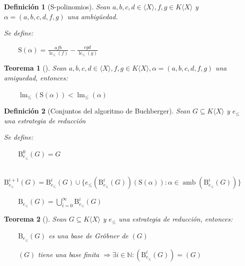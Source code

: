 \documentclass{amsbook}
\theoremstyle{customstyle}
\newtheorem{definition}{Definición}[section]
\newtheorem{theorem}{Teorema}[section]
\newcommand{\definición}[2][]{
  \begin{definition}[#1]
  \setlength{\parindent}{2em} %
  #2
  \end{definition}
}
\newcommand{\teorema}[2][]{
  \begin{theorem}[#1]
  \setlength{\parindent}{2em} %
  #2
  \end{theorem}
}
\DeclareMathOperator{\lm}{lm}
\DeclareMathOperator{\lc}{lc}
\DeclareMathOperator{\amb}{amb}
\begin{document}
\renewcommand{\S}{\text{S}}

\definición[S-polinomios] {
Sean $a, b, c, d ∈ ⟨X⟩, f, g ∈ K⟨X⟩$ y $α = (a, b, c, d, f, g)$ una ambigüedad.

Se define:

    $\S(α) = \frac{afb}{\lc_≤{(f)}} - \frac{cgd}{\lc_≤{(g)}}$
}

\teorema[]{
Sean $a, b, c, d ∈ ⟨X⟩, f, g ∈ K⟨X⟩, α = (a, b, c, d, f, g)$ una amiguedad, entonces:

    $\lm_≤{(\S(α))} < \lm_≤{(α)}$

}


\newcommand{\B}{\text{B}}

\definición[Conjuntos del algoritmo de Buchberger] {
Sean $G ⊆ K⟨X⟩$ y $e_≤$ una estrategia de reducción

Se define:

    $\B_{e_≤}^0(G) = G$

    $\B_{e_≤}^{i + 1}(G) = \B_{e_≤}^i(G) ∪ \{e_≤(\B_{e_≤}^i(G))(\S(α)) : α ∈ \amb(\B_{e_≤}^i(G))\}$

    $\B_{e_≤}(G) = \bigcup_{i = 0}^∞ \B_{e_≤}^i(G)$

}

\teorema[]{
  Sean $G ⊆ K⟨X⟩$ y $e_≤$ una estrategia de reducción, entonces:

    $\B_{e_≤}(G)$ es una base de Gröbner de $(G)$

    $(G)$ tiene una base finita $⇒ ∃i ∈ ℕ : (\B_{e_≤}^i(G)) = (G)$
}



\end{document}
